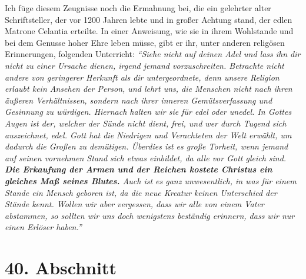 Ich füge diesem Zeugnisse noch die Ermahnung bei, die ein gelehrter alter
Schriftsteller, der vor 1200 Jahren lebte und in großer Achtung stand, der
edlen Matrone Celantia erteilte. In einer
Anweisung, wie sie in ihrem
Wohlstande und bei dem Genusse hoher Ehre leben müsse, gibt er ihr, unter
anderen religösen Erinnerungen, folgenden Unterricht:
\textit{"`Siehe nicht auf deinen
Adel und lass ihn dir nicht zu einer Ursache dienen, irgend jemand
vorzuschreiten. Betrachte nicht andere von geringerer Herkunft als dir
untergeordnete, denn unsere Religion erlaubt kein Ansehen der Person, und
lehrt uns, die Menschen nicht nach ihren äußeren Verhältnissen, sondern nach
ihrer inneren Gemütsverfassung und Gesinnung zu würdigen. Hiernach halten wir
sie für edel oder unedel. In Gottes Augen ist der, welcher der Sünde nicht
dient, frei, und wer durch Tugend sich auszeichnet, edel. Gott hat die
Niedrigen und Verachteten der Welt erwählt, um dadurch die Großen zu demütigen.
Überdies ist es große Torheit, wenn jemand auf seinen vornehmen Stand sich
etwas einbildet, da alle vor Gott gleich sind. \label{ref:09_39_erettung}
\textbf{Die Erkaufung der Armen und der
Reichen kostete Christus ein gleiches Maß seines Blutes.} Auch ist es ganz
unwesentlich, in was für einem Stande ein Mensch geboren ist, da die neue
Kreatur keinen Unterschied der Stände kennt. Wollen wir aber vergessen, dass wir
alle von einem Vater abstammen, so sollten wir uns doch wenigstens beständig
erinnern, dass wir nur einen Erlöser haben."'}

\section{40. Abschnitt} \label{kap9_ab40}

